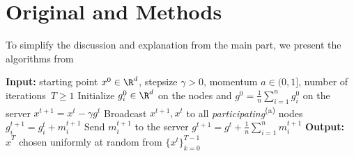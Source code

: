 \documentclass{article}
\begin{document}



\section{Original  and  Methods}
To simplify the discussion and explanation from the main part, we present the algorithms from \citep{tyurin2022dasha}

\begin{algorithm*}
  \caption{}
  \label{alg:main_algorithm_dasha}
  \begin{algorithmic}[1]
  \STATE \textbf{Input:} starting point $x^0 \in \R^d$, stepsize $\gamma > 0$, momentum $a \in (0, 1]$, 
  number of iterations~$T \geq 1$
  \STATE Initialize $g^0_i\in \R^d$ on the nodes and  $g^0 = \frac{1}{n}\sum_{i=1}^n g^0_i$ on the server
  \STATE $x^{t+1} = x^t - \gamma g^t$  
  \STATE Broadcast $x^{t+1}, x^{t}$ to all \textit{participating}\textsuperscript{\red (a)} nodes
  \STATE $g^{t+1}_i = g^{t}_i + m^{t+1}_i$
  \STATE Send $m^{t+1}_i$ to the server
  \ENDFOR
  \STATE $g^{t+1} = g^t + \frac{1}{n} \sum_{i=1}^n m^{t+1}_i$
  \ENDFOR
  \STATE \textbf{Output:} $\hat{x}^T$ chosen uniformly at random from $\{x^t\}_{k=0}^{T-1}$ 
  \end{algorithmic}
\end{algorithm*}
\end{document}

